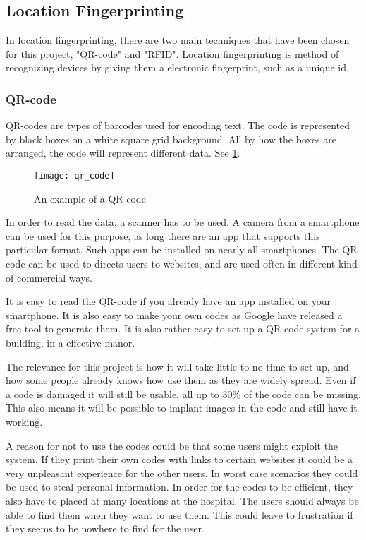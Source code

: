 \subsection{Location Fingerprinting}
In location fingerprinting, there are two main techniques that have been chosen for this project, "QR-code" and "RFID". Location fingerprinting is method of recognizing devices by giving them a electronic fingerprint, such as a unique id.

\subsubsection{QR-code} %
QR-codes are types of barcodes used for encoding text. The code is represented by black boxes on a white square grid background. All by how the boxes are arranged, the code will represent different data. See \cref{fig:qr}.

\begin{figure}
	\begin{center}
		\texttt{[image: qr\_code]}
	\end{center}
	\caption{An example of a QR code}
	\label{fig:qr}
\end{figure}

In order to read the data, a scanner has to be used. A camera from a smartphone can be used for this purpose, as long there are an app that supports this particular format. Such apps can be installed on nearly all smartphones\cite{QR_smart}. The QR-code can be used to directs users to websites, and are used often in different kind of commercial ways\cite{QR_url}.

It is easy to read the QR-code if you already have an app installed on your smartphone. It is also easy to make your own codes as Google have released a free tool to generate them\cite{QR_Google}. It is also rather easy to set up a QR-code system for a building, in a effective manor\cite{QR_easy}.

The relevance for this project is how it will take little to no time to set up\cite{QR_rel1}, and how some people already knows how use them as they are widely spread\cite{QR_spread}. Even if a code is damaged it will still be usable, all up to 30\% of the code can be missing\cite{QR_dama}. This also means it will be possible to implant images in the code and still have it working\cite{QR_image}.

A reason for not to use the codes could be that some users might exploit the system. If they print their own codes with links to certain websites it could be a very unpleasant experience for the other users\cite{QR_urlbad}. In worst case scenarios they could be used to steal personal information\cite{QR_information}.
In order for the codes to be efficient, they also have to placed at many locations at the hospital. The users should always be able to find them when they want to use them. This could leave to frustration if they seems to be nowhere to find for the user.


